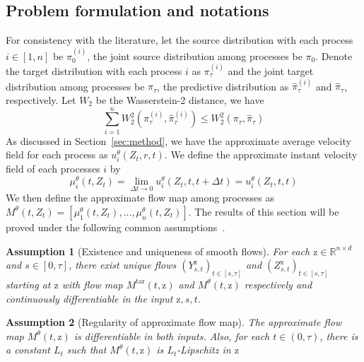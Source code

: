 \documentclass{article}
\newtheorem{assumption}{Assumption}
\begin{document}
\subsection{Problem formulation and notations}
\label{sec:notation}
For consistency with the literature, let the source distribution with each process $i \in[1,n]$ be $\pi^{(i)}_{0}$, the joint source distribution among processes be $\pi_{0}$. Denote the target distribution with each process $i$ as $\pi^{(i)}_{\tau}$ and the joint target distribution among processes be $\pi_{\tau}$, the predictive distribution as $\hat{\pi}^{(i)}_{\tau}$ and $\hat{\pi}_{\tau}$, respectively. Let $W_2$ be the Wasserstein-2 distance, we have 
\begin{equation}
    \sum_{i=1}^{n}W^2_2(\pi^{(i)}_{\tau}, \hat{\pi}^{(i)}_{\tau}) \leq W^2_2 (\pi_\tau, \hat{\pi}_{\tau})
\end{equation}
As discussed in Section~\ref{sec:method}, we have the approximate average velocity field for each process as $u^{\theta}_{i}(Z_t, r, t)$. We define the approximate instant velocity field of each processes $i$ by
\begin{equation}
    \mu^{\theta}_{i}(t, Z_t) = \lim_{\Delta t \to 0}  u^{\theta}_{i}(Z_t, t, t+ \Delta t) = u^{\theta}_{i}(Z_t, t,t)
\end{equation}
We then define the approximate flow map among processes as $M^{\theta}(t, Z_t) = [\mu^{\theta}_1(t, Z_t), ..., \mu^{\theta}_{n}(t, Z_t)]$. The results of this section will be proved under the following common assumptions~\citep{benton2024error}. 

\begin{assumption}[Existence and uniqueness of smooth flows]
\label{assum:existence}
For each $\mathrm{z} \in \mathbb{R}^{n \times d}$ and $s\in [0, \tau]$, there exist unique flows $(Y^{\mathrm{z}}_{s,t})_{t\in [s, \tau]}$ and $(Z^{\mathrm{z}}_{s,t})_{t\in [s, \tau]}$ starting at $\mathrm{z}$ with flow map $M^{\text{tar}}(t, \mathrm{z})$ and $M^{\theta}(t, \mathrm{z})$ respectively and continuously differentiable in the input $\mathrm{z},s,t$. 
\end{assumption}
\begin{assumption}[Regularity of approximate flow map]
\label{assum:lipschitz}
The approximate flow map $M^{\theta}(t, \mathrm{z})$ is differentiable in both inputs. Also, for each $t \in (0, \tau)$, there is a constant $L_t$ such that $M^{\theta}(t, \mathrm{z})$ is $L_t$-Lipschitz in $\mathrm{z}$
\end{assumption}
\end{document}
